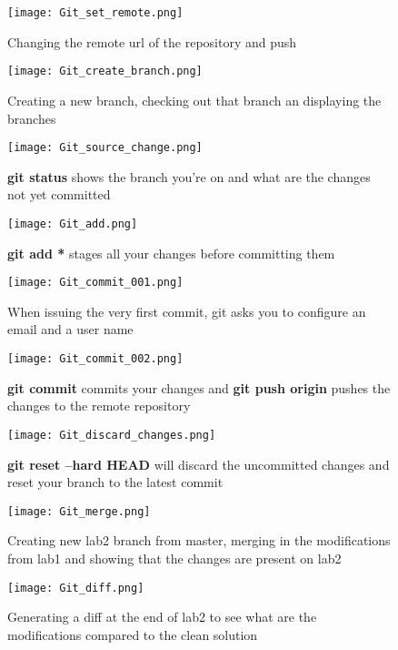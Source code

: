 \begin{appendices}
\begin{figure}[h]
	\centering
	\texttt{[image: Git\_set\_remote.png]}
	\caption{Changing the remote url of the repository and push}
\end{figure}

\begin{figure}[h]
	\centering
	\texttt{[image: Git\_create\_branch.png]}
	\caption{Creating a new branch, checking out that branch an displaying the branches}
\end{figure}

\begin{figure}[h]
	\centering
	\texttt{[image: Git\_source\_change.png]}
	\caption{\textbf{git status} shows the branch you're on and what are the changes not yet committed}
\end{figure}

\begin{figure}[h]
	\centering
	\texttt{[image: Git\_add.png]}
	\caption{\textbf{git add *} stages all your changes before committing them}
\end{figure}

\begin{figure}[h]
	\centering
	\texttt{[image: Git\_commit\_001.png]}
	\caption{When issuing the very first commit, git asks you to configure an email and a user name}
\end{figure}

\begin{figure}[h]
	\centering
	\texttt{[image: Git\_commit\_002.png]}
	\caption{\textbf{git commit} commits your changes and \textbf{git push origin} pushes the changes to the remote repository}
\end{figure}

\begin{figure}[h]
	\centering
	\texttt{[image: Git\_discard\_changes.png]}
	\caption{\textbf{git reset --hard HEAD} will discard the uncommitted changes and reset your branch to the latest commit}
\end{figure}

\begin{figure}[h]
	\centering
	\texttt{[image: Git\_merge.png]}
	\caption{Creating new lab2 branch from master, merging in the modifications from lab1 and showing that the changes are present on lab2}
\end{figure}

\begin{figure}[h]
	\centering
	\texttt{[image: Git\_diff.png]}
	\caption{Generating a diff at the end of lab2 to see what are the modifications compared to the clean solution}
\end{figure}


\end{appendices}
